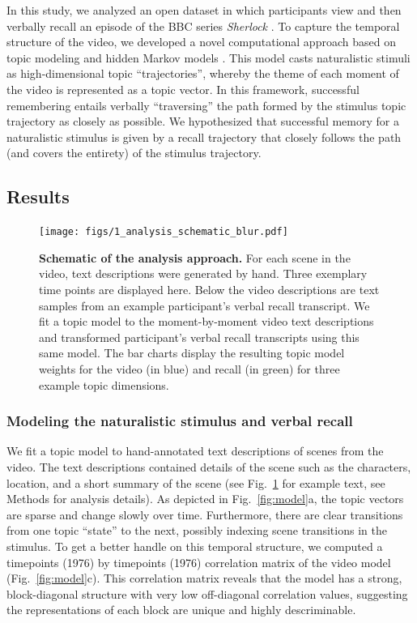 \documentclass{article}
\begin{document}
In this study, we analyzed an open dataset in which participants view and then verbally recall an episode of the BBC series \textit{Sherlock} \citep{ChenEtal17}. To capture the temporal structure of the video, we developed a novel computational approach based on topic modeling \citep{BleiEtal03} and hidden Markov models \citep{Rabi89, BaldEtal17}. This model casts naturalistic stimuli as high-dimensional topic ``trajectories'', whereby the theme of each moment of the video is represented as a topic vector. In this framework, successful remembering entails verbally ``traversing'' the path formed by the stimulus topic trajectory as closely as possible. We hypothesized that successful memory for a naturalistic stimulus is given by a recall trajectory that closely follows the path (and covers the entirety) of the stimulus trajectory.

\subsection{Results}

\begin{figure}[th!]
\centering
\texttt{[image: figs/1\_analysis\_schematic\_blur.pdf]}
\caption{\small \textbf{Schematic of the analysis approach.} For each scene in the video, text descriptions were generated by hand. Three exemplary time points are displayed here.  Below the video descriptions are text samples from an example participant's verbal recall transcript.  We fit a topic model to the moment-by-moment video text descriptions and transformed participant's verbal recall transcripts using this same model. The bar charts display the resulting topic model weights for the video (in blue) and recall (in green) for three example topic dimensions.}
\label{fig:schematic}
\end{figure}

\subsubsection{Modeling the naturalistic stimulus and verbal recall}
We fit a topic model \citep{BleiEtal03} to hand-annotated text descriptions of scenes from the video. The text descriptions contained details of the scene such as the characters, location, and a short summary of the scene (see Fig.~\ref{fig:schematic} for example text, see Methods for analysis details). As depicted in Fig.~\ref{fig:model}a, the topic vectors are sparse and change slowly over time. Furthermore, there are clear transitions from one topic ``state'' to the next, possibly indexing scene transitions in the stimulus. To get a better handle on this temporal structure, we computed a timepoints (1976) by timepoints (1976) correlation matrix of the video model (Fig.~\ref{fig:model}c).  This correlation matrix reveals that the model has a strong, block-diagonal structure with very low off-diagonal correlation values, suggesting the representations of each block are unique and highly descriminable.
\end{document}
